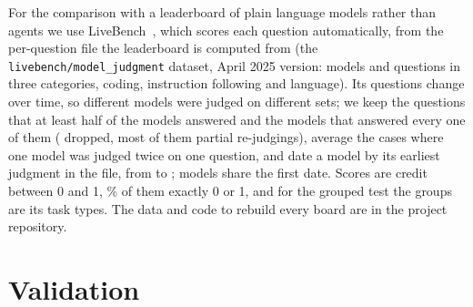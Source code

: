 \documentclass[11pt]{article}
\begin{document}
For the comparison with a leaderboard of plain language models rather than agents we use LiveBench~\citep{white2025livebench}, which scores each question automatically, from the per-question file the leaderboard is computed from (the \texttt{livebench/model\_judgment} dataset, April 2025 version: \NumLBModelsFile{} models and \NumLBQuestionsFile{} questions in three categories, coding, instruction following and language).
Its questions change over time, so different models were judged on different sets; we keep the \NumLBQuestionsKept{} questions that at least half of the models answered and the \NumLBModelsKept{} models that answered every one of them (\NumLBModelsDropped{} dropped, most of them partial re-judgings), average the \NumLBRepeated{} cases where one model was judged twice on one question, and date a model by its earliest judgment in the file, from \NumLBFirstDate{} to \NumLBLastDate{}; \NumLBOnFirstDate{} models share the first date.
Scores are credit between 0 and 1, \NumLBShareBinary\% of them exactly 0 or 1, and for the grouped test the groups are its \NumLBNTasks{} task types.
The data and code to rebuild every board are in the project repository.

\section{Validation}\label{sec:valid}
\end{document}
